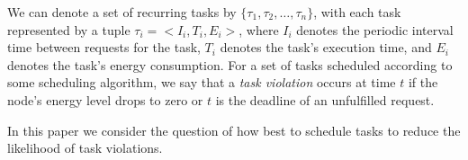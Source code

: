 We can denote a set of recurring tasks by $\{\tau_1, \tau_2, \ldots, \tau_n\}$, with each task represented by a tuple $\tau_i = <I_i, T_i, E_i>$, where $I_i$ denotes the periodic interval time between requests for the task, $T_i$ denotes the task's execution time, and $E_i$ denotes the task's energy consumption. For a set of tasks scheduled according to some scheduling algorithm, we say that a \textit{task violation} occurs at time $t$ if the node's energy level drops to zero or $t$ is the deadline of an unfulfilled request.  



In this paper we consider the question of how best to schedule tasks to reduce the likelihood of task violations.
